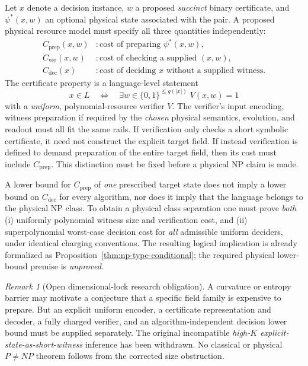 \documentclass[12pt]{article}
\theoremstyle{remark}
\newtheorem*{remark}{Remark}
\begin{document}
Let $x$ denote a decision instance, $w$ a proposed \emph{succinct}
binary certificate, and $\psi^*(x,w)$ an optional physical state
associated with the pair. A proposed physical resource model must
specify all three quantities independently:
\[
 \begin{aligned}
 C_{\mathrm{prep}}(x,w)&:
    \text{cost of preparing }\psi^*(x,w),\\
 C_{\mathrm{ver}}(x,w)&:
    \text{cost of checking a supplied }(x,w),\\
 C_{\mathrm{dec}}(x)&:
    \text{cost of deciding }x\text{ without a supplied witness}.
 \end{aligned}
\]
The certificate property is a language-level statement
\[
 x\in L\quad\Longleftrightarrow\quad
 \exists w\in\{0,1\}^{\le q(|x|)}\;V(x,w)=1
\]
with a \emph{uniform}, polynomial-resource verifier $V$. The
verifier's input encoding, witness preparation if required by the
\emph{chosen} physical semantics, evolution, and readout must all
fit the same rails. If verification only checks a short symbolic
certificate, it need not construct the explicit target field.
If instead verification is defined to demand preparation of the
entire target field, then its cost must include $C_{\mathrm{prep}}$.
This distinction must be fixed before a physical NP claim is made.

A lower bound for $C_{\mathrm{prep}}$ of \emph{one} prescribed target
state does not imply a lower bound on $C_{\mathrm{dec}}$ for every
algorithm, nor does it imply that the language belongs to the
physical NP class. To obtain a physical class separation one must
prove \emph{both} (i) uniformly polynomial witness size and
verification cost, and (ii) superpolynomial worst-case decision
cost for \emph{all} admissible uniform deciders, under identical
charging conventions. The resulting logical implication is already
formalized as Proposition~\ref{thm:np-type-conditional}; the
required physical lower-bound premise is \emph{unproved}.

\begin{remark}[Open dimensional-lock research obligation]
A curvature or entropy barrier may motivate a conjecture that a
specific field family is expensive to prepare. But an explicit
uniform encoder, a certificate representation and decoder, a
fully charged verifier, and an algorithm-independent decision lower
bound must be supplied separately. The original incompatible
\emph{high-$K$ explicit-state-as-short-witness} inference has been
withdrawn. No classical or physical $P\ne NP$ theorem follows
from the corrected size obstruction.
\end{remark}
\end{document}
